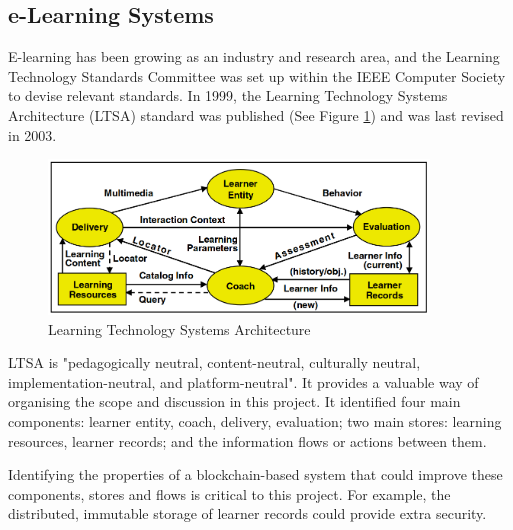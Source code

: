 \subsection{e-Learning Systems}

E-learning has been growing as an industry and research area, and the Learning Technology Standards Committee
was set up within the IEEE Computer Society to devise relevant standards. In 1999, the Learning Technology
Systems Architecture (LTSA) standard was published (See Figure \ref{fig:LTSA}) and was last revised in 2003.

\begin{figure}[!ht]
	\centering
	\includegraphics[width=0.9\textwidth]{ltsa2003}
	\caption[Learning Technology Systems Architecture]
	{Learning Technology Systems Architecture \citep[p.9]{ieee2003ltsa}}
	\label{fig:LTSA}
\end{figure}

LTSA is "pedagogically neutral, content-neutral, culturally neutral, implementation-neutral,
and platform-neutral"\citep[p.1]{ieee2003ltsa}. It provides a valuable way of organising
the scope and discussion in this project. It identified four main components: learner entity, coach,
delivery, evaluation; two main stores: learning resources, learner records; and the information flows
or actions between them.

Identifying the properties of a blockchain-based system that could improve these components, stores and
flows is critical to this project. For example, the distributed, immutable storage of learner records could
provide extra security.



